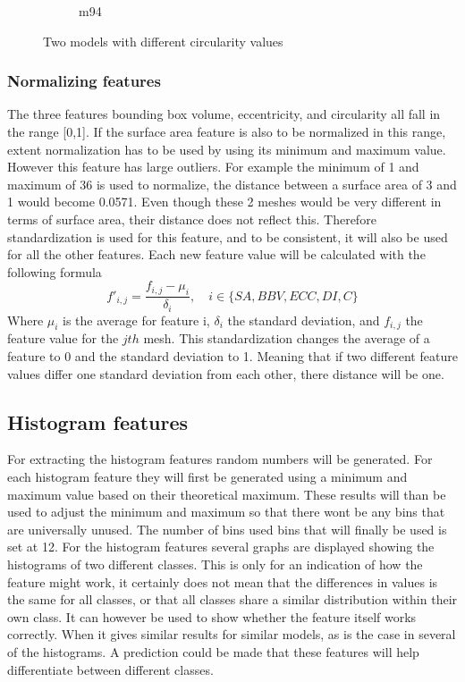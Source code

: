 \documentclass{bigdata}
\begin{document}
\begin{figure}[h!]
\begin{subfigure}[b]{0.4\linewidth}
		\caption{m94}
	\end{subfigure}
	\caption{Two models with different circularity values}
	\label{fig:circularity}
\end{figure}

\subsubsection{Normalizing  features}
The three features bounding box volume, eccentricity, and circularity all fall in the range [0,1]. If the surface area feature is also to be normalized in this range, extent normalization has to be used by using its minimum and maximum value. However this feature has large outliers. For example the minimum of 1 and maximum of 36 is used to normalize, the distance between a surface area of 3 and 1 would become 0.0571. Even though these 2 meshes would be very different in terms of surface area, their distance does not reflect this. Therefore standardization is used for this feature, and to be consistent, it will also be used for all the other  features. 
Each new feature value will be calculated with the following formula
\begin{equation}
f'_{i,j} = \frac{f_{i,j} - \mu_i}{\delta_i},\quad i \in \{SA,BBV,ECC,DI,C\}
\end{equation}
Where $\mu_i$ is the average for feature i, $\delta_i$ the standard deviation, and $f_{i,j}$ the feature value for the $jth$ mesh. This standardization changes  the average of a feature to 0 and the standard deviation to 1. Meaning that if two different feature values differ one standard deviation from each other, there distance will be one. 

\subsection{Histogram features}
For extracting the histogram features random numbers will be generated. 
For each histogram feature they will first be generated using a minimum and maximum value based on their theoretical maximum. These results will than be used to adjust the minimum and maximum so that there wont be any bins that are universally unused. The number of bins used bins that will finally be used is set at 12.
For the histogram features several graphs are displayed showing the histograms of two different classes. This is only for an indication of how the feature might work, it certainly does not mean that the differences in values is the same for all classes, or that all classes share a similar distribution within their own class. It can however be used to show whether the feature itself works correctly. When it gives similar results for similar models, as is the case in several of the histograms. A prediction could be made that these features will help differentiate between different classes. 
\end{document}
